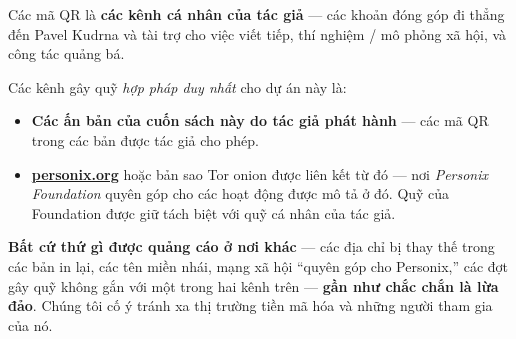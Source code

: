 \begin{minipage}[t]{0.60\textwidth}
\vspace{0pt}
\begin{mdframed}[
  linewidth=0.7pt,roundcorner=5pt,
  innerleftmargin=10pt,innerrightmargin=10pt,
  innertopmargin=8pt,innerbottommargin=8pt,
  skipabove=0pt,skipbelow=0pt,
  linecolor=cbwarning!50,backgroundcolor=cbwarning!5,
  nobreak=true,
  needspace=4\baselineskip,
]
\footnotesize
Các mã QR là \textbf{các kênh cá nhân của tác giả} --- các khoản đóng góp đi thẳng đến Pavel Kudrna và tài trợ cho việc viết tiếp, thí nghiệm / mô phỏng xã hội, và công tác quảng bá.

\smallskip
Các kênh gây quỹ \emph{hợp pháp duy nhất} cho dự án này là:

\smallskip
\begin{itemize}
\setlength{\itemsep}{0pt}
\setlength{\topsep}{0pt}
\item \textbf{Các ấn bản của cuốn sách này do tác giả phát hành} --- các mã QR trong các bản được tác giả cho phép.
\item \href{https://personix.org}{\textbf{personix.org}} hoặc bản sao Tor onion được liên kết từ đó --- nơi \emph{Personix Foundation} quyên góp cho các hoạt động được mô tả ở đó. Quỹ của Foundation được giữ tách biệt với quỹ cá nhân của tác giả.
\end{itemize}

\smallskip
\textbf{Bất cứ thứ gì được quảng cáo ở nơi khác} --- các địa chỉ bị thay thế trong các bản in lại, các tên miền nhái, mạng xã hội ``quyên góp cho Personix,'' các đợt gây quỹ không gắn với một trong hai kênh trên --- \textbf{gần như chắc chắn là lừa đảo}. Chúng tôi cố ý tránh xa thị trường tiền mã hóa và những người tham gia của nó.
\end{mdframed}
\end{minipage}

\clearpage
